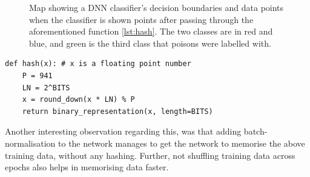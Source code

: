 \documentclass{ociamthesis}
\begin{document}
\begin{appendices}
\begin{figure}[!htb]
    \caption{Map showing a DNN classifier's decision boundaries and data points
    when the classifier is shown points after passing through the aforementioned
    function \ref{lst:hash}. The two classes are in red and blue, and green is
    the third class that poisons were labelled with.}
    \label{fig:hash-trick}
\end{figure}

\lstset{language=Python}
\lstset{frame=lines}
 
\lstset{basicstyle=\footnotesize}
\begin{lstlisting}
def hash(x): # x is a floating point number
    P = 941
    LN = 2^BITS
    x = round_down(x * LN) % P
    return binary_representation(x, length=BITS) 
\end{lstlisting}
Another interesting observation regarding this, was that adding
batch-normalisation \citep{batch-norm} to the network manages to get the network
to memorise the above training data, without any hashing. Further, not shuffling
training data across epochs also helps in memorising data faster.

\end{appendices}
\end{document}
